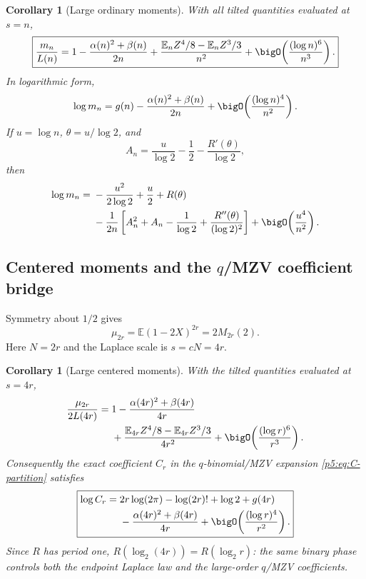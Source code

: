 \documentclass[11pt]{article}
\numberwithin{equation}{section}
\newtheorem{corollary}[theorem]{Corollary}
\theoremstyle{definition}
\theoremstyle{remark}
\newcommand{\E}{\mathbb E}
\begin{document}
\begin{corollary}[Large ordinary moments]\label{p5:cor:ordinary-moments}
With all tilted quantities evaluated at $s=n$,
\begin{equation}\label{p5:eq:mn-second}
 \boxed{
 \frac{m_n}{L(n)}=
 1-\frac{\alpha(n)^2+\beta(n)}{2n}
 +\frac{\E_nZ^4/8-\E_nZ^3/3}{n^2}
 +\bigO\!\left(\frac{(\log n)^6}{n^3}\right).}
\end{equation}
In logarithmic form,
\begin{equation}\label{p5:eq:logmn-first}
 \log m_n=g(n)-\frac{\alpha(n)^2+\beta(n)}{2n}
 +\bigO\!\left(\frac{(\log n)^4}{n^2}\right).
\end{equation}
If $u=\log n$, $\theta=u/\log2$, and
\begin{equation}\label{p5:eq:An}
 A_n=\frac{u}{\log2}-\frac12-\frac{R'(\theta)}{\log2},
\end{equation}
then
\begin{align}
 \log m_n={}&-\frac{u^2}{2\log2}+\frac u2+R(\theta)\nonumber\\
 &-\frac1{2n}\left[
 A_n^2+A_n-\frac1{\log2}+\frac{R''(\theta)}{(\log2)^2}
 \right]
 +\bigO\!\left(\frac{u^4}{n^2}\right).
 \label{p5:eq:logmn-R}
\end{align}
\end{corollary}

\subsection{Centered moments and the $q$/MZV coefficient bridge}

Symmetry about $1/2$ gives
\begin{equation}\label{p5:eq:mu-M}
 \mu_{2r}=\E(1-2X)^{2r}=2M_{2r}(2).
\end{equation}
Here $N=2r$ and the Laplace scale is $s=cN=4r$.

\begin{corollary}[Large centered moments]\label{p5:cor:centered-moments}
With the tilted quantities evaluated at $s=4r$,
\begin{align}
 \frac{\mu_{2r}}{2L(4r)}={}&
 1-\frac{\alpha(4r)^2+\beta(4r)}{4r}\nonumber\\
 &+\frac{\E_{4r}Z^4/8-\E_{4r}Z^3/3}{4r^2}
 +\bigO\!\left(\frac{(\log r)^6}{r^3}\right).
 \label{p5:eq:mu-transfer}
\end{align}
Consequently the exact coefficient $C_r$ in the $q$-binomial/MZV expansion
\cref{p5:eq:C-partition} satisfies
\begin{equation}\label{p5:eq:Cr-asymp}
 \boxed{\begin{aligned}
 \log C_r={}&2r\log(2\pi)-\log(2r)!+\log2+g(4r)\\
 &-\frac{\alpha(4r)^2+\beta(4r)}{4r}
 +\bigO\!\left(\frac{(\log r)^4}{r^2}\right).
 \end{aligned}}
\end{equation}
Since $R$ has period one,
$R(\log_2(4r))=R(\log_2r)$: the same binary phase controls both the endpoint
Laplace law and the large-order $q$/MZV coefficients.
\end{corollary}
\end{document}
